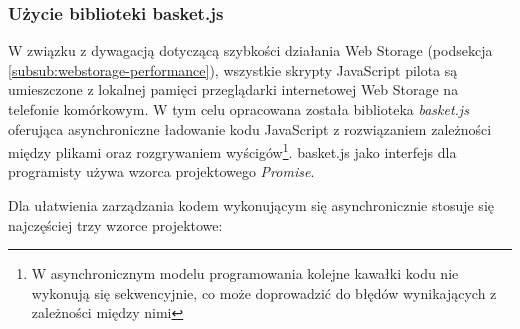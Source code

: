 \subsubsection{Użycie biblioteki basket.js}
\label{subsub:tools-basketjs}

W związku z dywagacją dotyczącą szybkości działania Web Storage (podsekcja \ref{subsub:webstorage-performance}), wszystkie skrypty JavaScript pilota są umieszczone z lokalnej pamięci przeglądarki internetowej Web Storage na telefonie komórkowym. W tym celu opracowana została biblioteka \emph{basket.js} oferująca asynchroniczne ładowanie kodu JavaScript z rozwiązaniem zależności między plikami oraz rozgrywaniem wyścigów\footnote{W asynchronicznym modelu programowania kolejne kawałki kodu nie wykonują się sekwencyjnie, co może doprowadzić do błędów wynikających z zależności między nimi}. basket.js jako interfejs dla programisty używa wzorca projektowego \emph{Promise}.

Dla ułatwienia zarządzania kodem wykonującym się asynchronicznie stosuje się najczęściej trzy wzorce projektowe:

